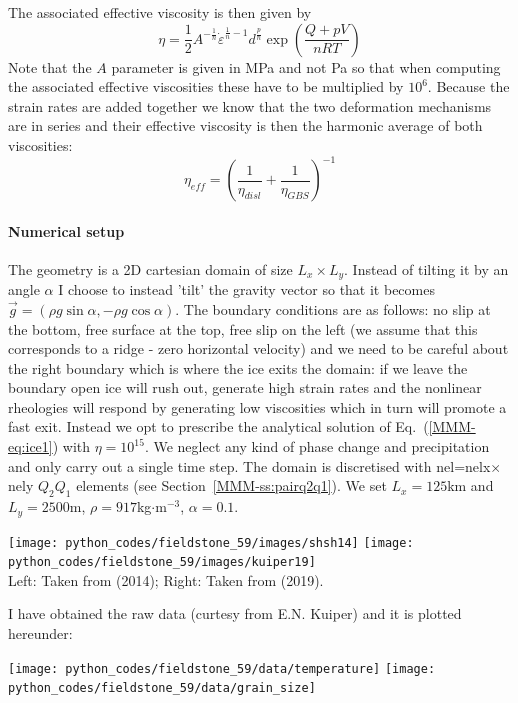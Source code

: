 The associated effective viscosity is then given by 
\[
\eta = \frac{1}{2}  A^{-\frac{1}{n}} \dot{\varepsilon}^{\frac{1}{n}-1}  d^{\frac{p}{n}} \exp \left( \frac{Q+pV}{nRT} \right)
\]
Note that the $A$ parameter is given in MPa and not Pa so that when computing the 
associated effective viscosities these have to be multiplied by $10^6$.
Because the strain rates are added together we know that the two deformation mechanisms are in series and their
effective viscosity is then the harmonic average of both viscosities:
\[
\eta_{eff} = \left(\frac{1}{\eta_{disl}} + \frac{1}{\eta_{GBS}}  \right)^{-1}
\]

\paragraph{Numerical setup}

The geometry is a 2D cartesian domain of size $L_x \times L_y$. Instead of tilting it by an angle $\alpha$
I choose to instead 'tilt' the gravity vector so that it becomes 
$\vec{g}=(\rho g \sin\alpha,-\rho g\cos\alpha)$.
The boundary conditions are as follows: no slip at the bottom, free surface at the top, 
free slip on the left (we assume that this corresponds to a ridge - zero horizontal velocity)
and we need to be careful about the right boundary which is where the ice exits the domain:
if we leave the boundary open ice will rush out, generate high strain rates and the nonlinear 
rheologies will respond by generating low viscosities which in turn will promote a fast 
exit. Instead we opt to prescribe the analytical solution of Eq.~(\ref{MMM-eq:ice1}) with $\eta=10^{15}$.
We neglect any kind of phase change and precipitation and only carry out a single time step.
The domain is discretised with nel=nelx$\times$nely $Q_2Q_1$ elements (see Section~\ref{MMM-ss:pairq2q1}).
We set $L_x=125$km and $L_y=2500$m, $\rho=917$kg$\cdot$m$^{-3}$, $\alpha=0.1$\degree.



\begin{center}
\texttt{[image: python\_codes/fieldstone\_59/images/shsh14]}
\texttt{[image: python\_codes/fieldstone\_59/images/kuiper19]}\\
{\captionfont Left: Taken from \textcite{shsh14} (2014); 
Right: Taken from \textcite{kuiper19} (2019).}
\end{center}

I have obtained the raw data (curtesy from E.N. Kuiper) and it is plotted hereunder:
\begin{center}
\texttt{[image: python\_codes/fieldstone\_59/data/temperature]}
\texttt{[image: python\_codes/fieldstone\_59/data/grain\_size]}
\end{center}

